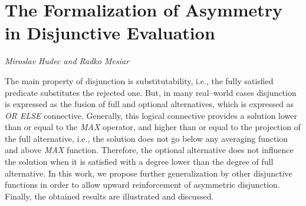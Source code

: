\documentclass[../booklet.tex]{subfiles}
\begin{document}
\section[The Formalization of Asymmetry in Disjunctive Evaluation. {\it Miroslav Hudec and Radko Mesiar}]{The Formalization of Asymmetry in Disjunctive Evaluation}
 

\begin{center}
  {\it Miroslav Hudec and Radko Mesiar}
\end{center}

\vskip 0.8cm


The main property of disjunction is substitutability, i.e., the fully satisfied predicate substitutes the rejected one. But, in many real--world cases disjunction is expressed as the fusion of full and optional alternatives, which is expressed as \textit{OR ELSE} connective. 
Generally, this logical connective provides a solution lower than or equal to the \textit{MAX} operator, and higher than or equal to the projection of the full alternative, i.e., the solution does not go below any averaging function and above \textit{MAX} function. Therefore, the optional alternative does not influence the solution when it is satisfied with a degree lower than the degree of full alternative. In this work, we propose further generalization by other disjunctive functions in order to allow upward reinforcement of asymmetric disjunction. Finally, the obtained results are illustrated and discussed.

\end{document}
